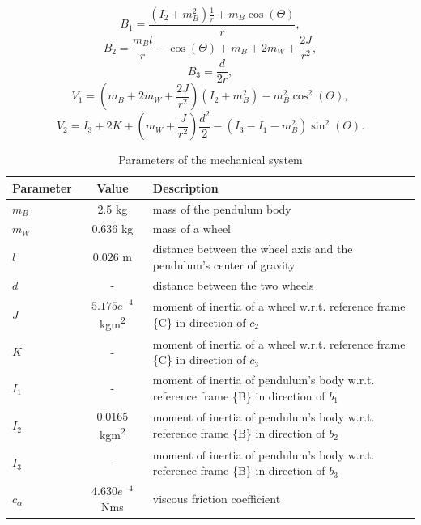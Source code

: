 	\begin{equation}
		B_{1} = \frac{(I_2 + m_B^2) \frac{1}{r} + m_B \cos(\Theta)}{r},
	\end{equation}
	\begin{equation}
		B_{2} = \frac{m_B l}{r} - \cos(\Theta) + m_B + 2m_W + \frac{2J}{r^2},
	\end{equation}
	\begin{equation}
		B_{3} = \frac{d}{2r},
	\end{equation}
	\begin{equation}
		V_{1} = (m_B + 2m_W + \frac{2J}{r^2}) (I_2 + m_B^2) - m_B^2 \cos^2(\Theta),
	\end{equation}
	\begin{equation}
		V_{2} = I_3 + 2K + (m_W + \frac{J}{r^2}) \frac{d^2}{2} - (I_3 - I_1 - m_B^2) \sin^2(\Theta).
	\end{equation}
	
	
	\begin{table}[h!]
		\centering
		\caption{Parameters of the mechanical system}
		\label{tab:parameters}
		\begin{tabular}{lcl}
			\toprule
			Parameter & Value & Description \\
			\midrule
			$m_B$ & 2.5 kg & mass of the pendulum body \\
			$m_W$ & 0.636 kg & mass of a wheel \\
			$l$ & 0.026 m & distance between the wheel axis and the pendulum's center of gravity \\
			$d$ & - & distance between the two wheels \\
			$J$ & \(5.175 e^{-4}\) kgm\textsuperscript{2} & moment of inertia of a wheel w.r.t. reference frame \{C\} in direction of \(c_2\) \\
			$K$ & - & moment of inertia of a wheel w.r.t. reference frame \{C\} in direction of \(c_3\) \\
			$I_1$ & - & moment of inertia of pendulum's body w.r.t. reference frame \{B\} in direction of \(b_1\) \\
			$I_2$ & \(0.0165\) kgm\textsuperscript{2} & moment of inertia of pendulum's body w.r.t. reference frame \{B\} in direction of \(b_2\) \\
			$I_3$ & - & moment of inertia of pendulum's body w.r.t. reference frame \{B\} in direction of \(b_3\) \\
			$c_\alpha$ & \(4.630 e^{-4}\) Nms & viscous friction coefficient \\
			\bottomrule
		\end{tabular}
	\end{table}


